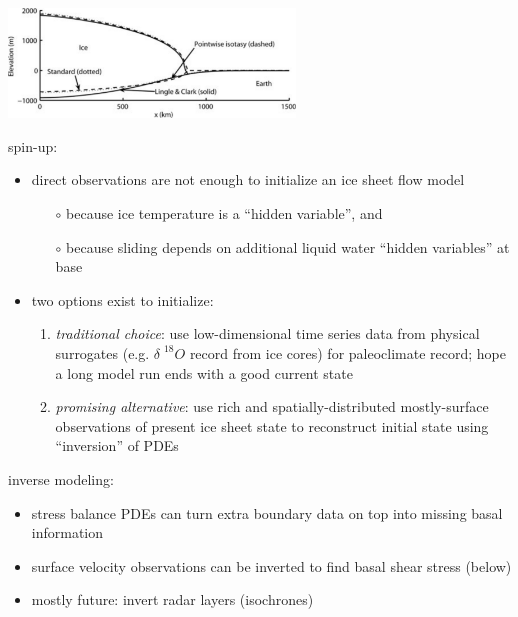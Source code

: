 \documentclass[titlepage,letterpaper,final,12pt]{scrartcl}
\begin{document}
\begin{center}
  \includegraphics[width=3.0in]{earthcompare}
\end{center}

spin-up:

\begin{itemize}
\item direct observations are not enough to initialize an ice sheet flow model
  \begin{itemize}
  \item[$\circ$] because ice temperature is a ``hidden variable'', and
  \item[$\circ$] because sliding depends on additional liquid water ``hidden variables'' at base
  \end{itemize}
\item two options exist to initialize:
  \small
  \begin{enumerate}
  \item \emph{traditional choice}: use low-dimensional time series data from physical surrogates (e.g. $\delta \phantom{|}^{18}O$ record from ice cores) for paleoclimate record; hope a long model run ends with a good current state
  \item \emph{promising alternative}:  use rich and spatially-distributed mostly-surface observations of present ice sheet state to reconstruct initial state using ``inversion'' of PDEs
  \normalsize
  \end{enumerate}
\end{itemize}

inverse modeling:

\begin{itemize}
\item stress balance PDEs can turn extra boundary data on top into missing basal information
\item surface velocity observations can be inverted to find basal shear stress (below)
\item mostly future: invert radar layers (isochrones)
\end{itemize}
\end{document}
